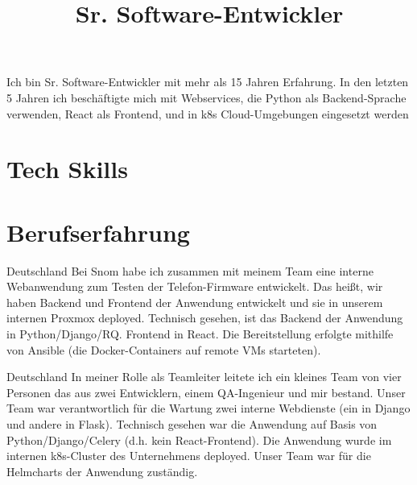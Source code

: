 \documentclass[11pt,a4paper,sans]{moderncv}
\title{Sr. Software-Entwickler}
\begin{document}
    \makecvtitle

    Ich bin Sr. Software-Entwickler mit mehr als 15 Jahren Erfahrung. In den
    letzten 5 Jahren ich beschäftigte mich mit Webservices, die Python als
    Backend-Sprache verwenden, React als Frontend, und in k8s Cloud-Umgebungen
    eingesetzt werden

    \section{Tech Skills}

    \section{Berufserfahrung}

     { Deutschland }{ Bei Snom habe ich zusammen mit meinem Team eine interne
     Webanwendung zum Testen der Telefon-Firmware entwickelt. Das heißt, wir
     haben Backend und Frontend der Anwendung entwickelt und sie in unserem
     internen Proxmox deployed. Technisch gesehen, ist das Backend der
     Anwendung in Python/Django/RQ. Frontend in React. Die Bereitstellung
     erfolgte mithilfe von Ansible (die Docker-Containers auf remote
     VMs starteten).}

     { Deutschland }{ In meiner Rolle als Teamleiter leitete ich ein kleines
     Team von vier Personen das aus zwei Entwicklern, einem QA-Ingenieur und
     mir bestand. Unser Team war verantwortlich für die Wartung
     zwei interne Webdienste (ein in Django und andere in Flask).
     Technisch gesehen war die Anwendung auf Basis
     von Python/Django/Celery (d.h. kein React-Frontend). Die Anwendung wurde im
     internen k8s-Cluster des Unternehmens deployed. Unser Team war für
     die Helmcharts der Anwendung zuständig.}

   \vspace{0.4cm}
\end{document}
